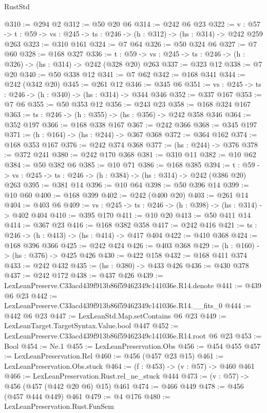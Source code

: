 \begin{lexlean}{RustStd}
\begin{coremodule}
@310 := @294 @2
@312 := @50 @20 @6
@314 := @242 @6 @23
@322 := {v : @57} ->
  {t : @59} -> {vs : @245} -> {ts : @246} -> (h : @312) -> (hs : @314) -> @242 @259 @263
@323 := @310 @161
@324 := @7 @64
@326 := @50 @324 @6
@327 := @7 @60
@328 := @168 @327
@336 := {t : @59} -> {vs : @245} -> {ts : @246} -> (h : @326) -> (hs : @314) -> @242 (@328 @20) @263
@337 := @323 @12
@338 := @7 @20
@340 := @50 @338 @12
@341 := @7 @62
@342 := @168 @341
@344 := @242 (@342 @20)
@345 := @261 @12
@346 := @345 @6
@351 := {vs : @245} -> {ts : @246} -> (h : @340) -> (hs : @314) -> @344 @346
@352 := @337 @167
@353 := @7 @6
@355 := @50 @353 @12
@356 := @243 @23
@358 := @168 @324 @167
@363 := {ts : @246} -> (h : @355) -> (hs : @356) -> @242 @358 @346
@364 := @352 @197
@366 := @168 @338 @167
@367 := @242 @366
@368 := @345 @197
@371 := (h : @164) -> (hs : @244) -> @367 @368
@372 := @364 @162
@374 := @168 @353 @167
@376 := @242 @374 @368
@377 := (hs : @244) -> @376
@378 := @372 @241
@380 := @242 @170 @368
@381 := @310 @11
@382 := @10 @62
@384 := @50 @382 @6
@385 := @10 @71
@386 := @168 @385
@394 := {t : @59} -> {vs : @245} -> {ts : @246} -> (h : @384) -> (hs : @314) -> @242 (@386 @20) @263
@395 := @381 @14
@396 := @10 @64
@398 := @50 @396 @14
@399 := @10 @60
@400 := @168 @399
@402 := @242 (@400 @20)
@403 := @261 @14
@404 := @403 @6
@409 := {vs : @245} -> {ts : @246} -> (h : @398) -> (hs : @314) -> @402 @404
@410 := @395 @170
@411 := @10 @20
@413 := @50 @411 @14
@414 := @367 @23
@416 := @168 @382 @358
@417 := @242 @416
@421 := {ts : @246} -> (h : @413) -> (hs : @414) -> @417 @404
@422 := @410 @368
@424 := @168 @396 @366
@425 := @242 @424
@426 := @403 @368
@429 := (h : @160) -> (hs : @376) -> @425 @426
@430 := @422 @158
@432 := @168 @411 @374
@433 := @242 @432
@435 := (hs : @380) -> @433 @426
@436 := @430 @378
@437 := @242 @172
@438 := @437 @426
@439 := LexLeanPreserve.C33acd439f913b86f59462349c141036e.R14.denote
@441 := @439 @6 @23
@442 := LexLeanPreserve.C33acd439f913b86f59462349c141036e.R14.__fits_0
@444 := @442 @6 @23
@447 := LexLeanStd.Map.setContains @6 @23
@449 := LexLeanTarget.TargetSyntax.Value.bool @447
@452 := LexLeanPreserve.C33acd439f913b86f59462349c141036e.R14.root @6 @23
@453 := Bool
@454 := Ne.{1}
@455 := LexLeanPreservation.Obs
@456 := @454 @455
@457 := LexLeanPreservation.Rel
@460 := @456 (@457 @23 @15)
@461 := LexLeanPreservation.Obs.stuck
@464 := (f : @453) -> (v : @57) -> @460 @461
@466 := LexLeanPreservation.Rust.rel_ne_stuck @444
@473 := (v : @57) -> @456 (@457 (@442 @20 @6) @15) @461
@474 := @466 @449
@478 := @456 (@457 @444 @449) @461
@479 := @4 @176
@480 := LexLeanPreservation.Rust.FunSem

\end{coremodule}
\end{lexlean}
